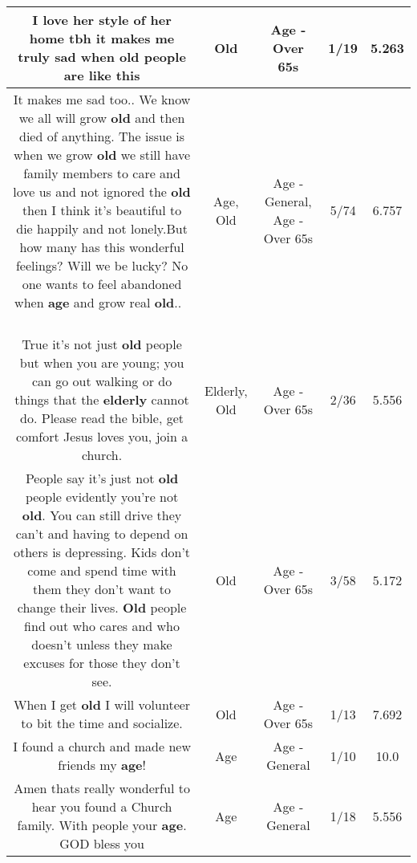 \documentclass[11pt]{article}
\newlength\mylength
\begin{document}
\begin{center}
\begin{longtable}{|C{.65\mylength}|C{.30\mylength}|C{.12\mylength}|C{.12\mylength}|C{.12\mylength}|}
  \small I love her style of her home tbh it makes me truly sad when \textbf{old} people are like this\normalsize   & Old & Age - Over 65s & 1/19 & 5.263 \\  \hline
  \small It makes me sad too.. We know we all will grow \textbf{old} and then died of anything. The issue is when we grow \textbf{old} we still have family members to care and love us and not ignored the \textbf{old} then I think it's beautiful to die happily and not lonely.But how many has this wonderful feelings? Will we be lucky? No one wants to feel abandoned when \textbf{age} and grow real \textbf{old}.. 🙏😭\normalsize   & Age, Old & Age - General, Age - Over 65s & 5/74 & 6.757 \\  \hline
  \small True it's not just \textbf{old} people but when you are young; you can go out walking or do things that the \textbf{elderly} cannot do.  Please read the bible, get comfort Jesus loves you, join a church.\normalsize   & Elderly, Old & Age - Over 65s & 2/36 & 5.556 \\  \hline
  \small People say it's just not \textbf{old} people evidently you're not \textbf{old}. You can still drive they can't and having to depend on others is depressing. Kids don't come and spend time with them they don't want to change their lives. \textbf{Old} people find out who cares and who doesn't unless they make excuses for those they don't see.\normalsize   & Old & Age - Over 65s & 3/58 & 5.172 \\  \hline
  \small When I get \textbf{old} I will volunteer to bit the time and socialize.\normalsize   & Old & Age - Over 65s & 1/13 & 7.692 \\  \hline
  \small I found a church and made new friends my \textbf{age}!\normalsize   & Age & Age - General & 1/10 & 10.0 \\  \hline
  \small Amen thats really wonderful to hear you found a Church family. With people your \textbf{age}. GOD bless you\normalsize   & Age & Age - General & 1/18 & 5.556 \\  \hline

\end{longtable}
\end{center}
\end{document}

